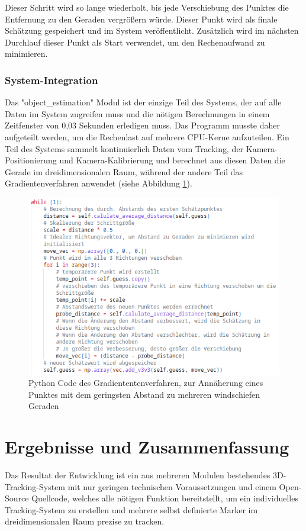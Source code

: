 \documentclass[12pt, ngerman]{article}
\begin{document}
Dieser Schritt wird so lange wiederholt, bis jede Verschiebung des Punktes die Entfernung zu den Geraden vergrößern würde. Dieser Punkt wird als finale Schätzung gespeichert und im System veröffentlicht. Zusätzlich wird im nächsten Durchlauf dieser Punkt als Start verwendet, um den Rechenaufwand zu minimieren.

\subsubsection{System-Integration}
Das "object\_estimation" Modul ist der einzige Teil des Systems, der auf alle Daten im System zugreifen muss und die nötigen Berechnungen in einem Zeitfenster von 0,03 Sekunden erledigen muss. Das Programm musste daher aufgeteilt werden, um die Rechenlast auf mehrere CPU-Kerne aufzuteilen. Ein Teil des Systems sammelt kontinuierlich Daten vom Tracking, der Kamera-Positionierung und Kamera-Kalibrierung und berechnet aus diesen Daten die Gerade im dreidimensionalen Raum, während der andere Teil das Gradientenverfahren anwendet (siehe Abbildung \ref{Abb: code}).
\begin{figure}[H]
  \centering
  \includegraphics[width=\textwidth]{code.png}
  \caption{Python Code des Gradiententenverfahren, zur Annäherung eines Punktes mit dem geringsten Abstand zu mehreren windschiefen Geraden}
  \label{Abb: code}
\end{figure}

\newpage
\section{Ergebnisse und Zusammenfassung}
Das Resultat der Entwicklung ist ein aus mehreren Modulen bestehendes 3D-Tracking-System mit nur geringen technischen Voraussetzungen und einem Open-Source Quellcode, welches alle nötigen Funktion bereitstellt, um ein individuelles Tracking-System zu erstellen und mehrere selbst definierte Marker im dreidimensionalen Raum prezise zu tracken.
\end{document}
